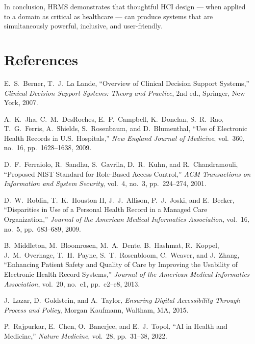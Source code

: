\documentclass[12pt,a4paper]{report}
\begin{document}
In conclusion, HRMS demonstrates that thoughtful HCI design — when applied to a domain as critical as healthcare — can produce systems that are simultaneously powerful, inclusive, and user-friendly.

\chapter*{References}

\begingroup
\fontsize{10}{14}\selectfont
{}

\noindent[1] E.\ S.\ Berner, T.\ J.\ La Lande, ``Overview of Clinical Decision Support Systems,'' \textit{Clinical Decision Support Systems: Theory and Practice}, 2nd ed., Springer, New York, 2007.

\noindent[2] A.\ K.\ Jha, C.\ M.\ DesRoches, E.\ P.\ Campbell, K.\ Donelan, S.\ R.\ Rao, T.\ G.\ Ferris, A.\ Shields, S.\ Rosenbaum, and D.\ Blumenthal, ``Use of Electronic Health Records in U.S.\ Hospitals,'' \textit{New England Journal of Medicine}, vol.\ 360, no.\ 16, pp.\ 1628--1638, 2009.

\noindent[3] D.\ F.\ Ferraiolo, R.\ Sandhu, S.\ Gavrila, D.\ R.\ Kuhn, and R.\ Chandramouli, ``Proposed NIST Standard for Role-Based Access Control,'' \textit{ACM Transactions on Information and System Security}, vol.\ 4, no.\ 3, pp.\ 224--274, 2001.

\noindent[4] D.\ W.\ Roblin, T.\ K.\ Houston II, J.\ J.\ Allison, P.\ J.\ Joski, and E.\ Becker, ``Disparities in Use of a Personal Health Record in a Managed Care Organization,'' \textit{Journal of the American Medical Informatics Association}, vol.\ 16, no.\ 5, pp.\ 683--689, 2009.

\noindent[5] B.\ Middleton, M.\ Bloomrosen, M.\ A.\ Dente, B.\ Hashmat, R.\ Koppel, J.\ M.\ Overhage, T.\ H.\ Payne, S.\ T.\ Rosenbloom, C.\ Weaver, and J.\ Zhang, ``Enhancing Patient Safety and Quality of Care by Improving the Usability of Electronic Health Record Systems,'' \textit{Journal of the American Medical Informatics Association}, vol.\ 20, no.\ e1, pp.\ e2--e8, 2013.

\noindent[6] J.\ Lazar, D.\ Goldstein, and A.\ Taylor, \textit{Ensuring Digital Accessibility Through Process and Policy}, Morgan Kaufmann, Waltham, MA, 2015.

\noindent[7] P.\ Rajpurkar, E.\ Chen, O.\ Banerjee, and E.\ J.\ Topol, ``AI in Health and Medicine,'' \textit{Nature Medicine}, vol.\ 28, pp.\ 31--38, 2022.
\end{document}
